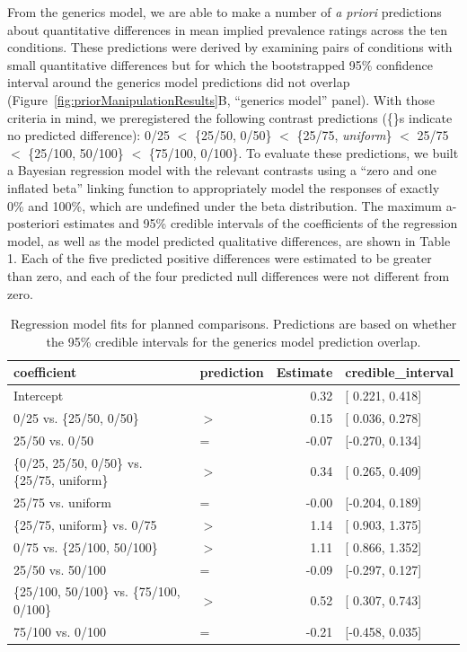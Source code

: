 \documentclass[floatsintext,man]{apa6}
\theoremstyle{definition}
\theoremstyle{definition}
\theoremstyle{definition}
\theoremstyle{remark}
\begin{document}
From the generics model, we are able to make a number of \emph{a priori}
predictions about quantitative differences in mean implied prevalence
ratings across the ten conditions. These predictions were derived by
examining pairs of conditions with small quantitative differences but
for which the bootstrapped 95\% confidence interval around the generics
model predictions did not overlap
(Figure~\ref{fig:priorManipulationResults}B, \enquote{generics model}
panel). With those criteria in mind, we preregistered the following
contrast predictions (\{\}s indicate no predicted difference): 0/25
\(<\) \{25/50, 0/50\} \(<\) \{25/75, \emph{uniform}\} \(<\) 25/75 \(<\)
\{25/100, 50/100\} \(<\) \{75/100, 0/100\}. To evaluate these
predictions, we built a Bayesian regression model with the relevant
contrasts using a \enquote{zero and one inflated beta} linking function
to appropriately model the responses of exactly 0\% and 100\%, which are
undefined under the beta distribution. The maximum a-posteriori
estimates and 95\% credible intervals of the coefficients of the
regression model, as well as the model predicted qualitative
differences, are shown in Table 1. Each of the five predicted positive
differences were estimated to be greater than zero, and each of the four
predicted null differences were not different from zero.

\begin{table}[H]
\centering
\begingroup\fontsize{9pt}{10pt}\selectfont
\begin{tabular}{llrl}
  \hline
coefficient & prediction & Estimate & credible\_interval \\ 
  \hline
Intercept &  & 0.32 & [ 0.221, 0.418] \\ 
  0/25 vs. \{25/50, 0/50\} & $>$ & 0.15 & [ 0.036, 0.278] \\ 
  25/50 vs. 0/50 & = & -0.07 & [-0.270, 0.134] \\ 
  \{0/25, 25/50, 0/50\} vs. \{25/75, uniform\} & $>$ & 0.34 & [ 0.265, 0.409] \\ 
  25/75 vs. uniform & = & -0.00 & [-0.204, 0.189] \\ 
  \{25/75, uniform\} vs. 0/75 & $>$ & 1.14 & [ 0.903, 1.375] \\ 
  0/75 vs. \{25/100, 50/100\} & $>$ & 1.11 & [ 0.866, 1.352] \\ 
  25/50 vs. 50/100 & = & -0.09 & [-0.297, 0.127] \\ 
  \{25/100, 50/100\} vs. \{75/100, 0/100\} & $>$ & 0.52 & [ 0.307, 0.743] \\ 
  75/100 vs. 0/100 & = & -0.21 & [-0.458, 0.035] \\ 
   \hline
\end{tabular}
\endgroup
\caption{Regression model fits for planned comparisons. Predictions are based on whether the 95\% credible intervals for the generics model prediction overlap.} 
\end{table}
\end{document}
